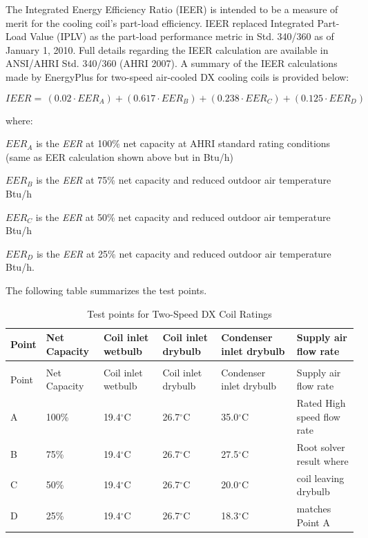 The Integrated Energy Efficiency Ratio (IEER) is intended to be a measure of merit for the cooling coil's part-load efficiency. IEER replaced Integrated Part-Load Value (IPLV) as the part-load performance metric in Std. 340/360 as of January 1, 2010. Full details regarding the IEER calculation are available in ANSI/AHRI Std. 340/360 (AHRI 2007). A summary of the IEER calculations made by EnergyPlus for two-speed air-cooled DX cooling coils is provided below:

\begin{equation}
  IEER = \,(0.02 \cdot EE{R_A}) + (0.617 \cdot EE{R_B}) + (0.238 \cdot EE{R_C}) + (0.125 \cdot EE{R_D})
\end{equation}

where:

\(EER_A\) is the \emph{EER} at 100\% net capacity at AHRI standard rating conditions (same as EER calculation shown above but in Btu/h)

\(EER_B\) is the \emph{EER} at 75\% net capacity and reduced outdoor air temperature Btu/h

\(EER_C\) is the \emph{EER} at 50\% net capacity and reduced outdoor air temperature Btu/h

\(EER_D\) is the \emph{EER} at 25\% net capacity and reduced outdoor air temperature Btu/h.

The following table summarizes the test points.

\begin{longtable}[c]{p{0.8in}p{0.8in}p{0.8in}p{0.8in}p{0.8in}p{2.0in}}
\caption{Test points for Two-Speed DX Coil Ratings \label{table:test-points-for-two-speed-dx-coil-ratings}} \tabularnewline
\toprule
Point & Net Capacity & Coil inlet wetbulb & Coil inlet drybulb & Condenser inlet drybulb & Supply air flow rate \tabularnewline
\midrule
\endfirsthead

\caption[]{Test points for Two-Speed DX Coil Ratings} \tabularnewline
\toprule
Point & Net Capacity & Coil inlet wetbulb & Coil inlet drybulb & Condenser inlet drybulb & Supply air flow rate \tabularnewline
\midrule
\endhead

A & 100\% & 19.4\(^{\circ}\)C & 26.7\(^{\circ}\)C & 35.0\(^{\circ}\)C & Rated High speed flow rate \tabularnewline
\midrule
B & 75\% & 19.4\(^{\circ}\)C & 26.7\(^{\circ}\)C & 27.5\(^{\circ}\)C & Root solver result where \tabularnewline
C & 50\% & 19.4\(^{\circ}\)C & 26.7\(^{\circ}\)C & 20.0\(^{\circ}\)C & coil leaving drybulb\tabularnewline
D & 25\% & 19.4\(^{\circ}\)C & 26.7\(^{\circ}\)C & 18.3\(^{\circ}\)C & matches Point A\tabularnewline
\bottomrule
\end{longtable}


